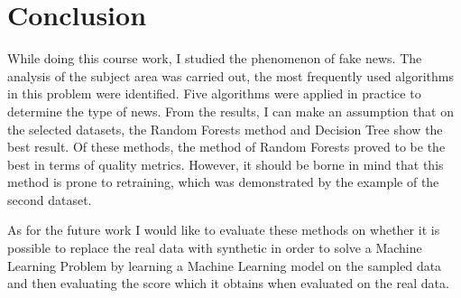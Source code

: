 \newpage
\section{Conclusion}\label{sec:concl}

While doing this course work, I studied the phenomenon of fake news.
The analysis of the subject area was carried out, the most frequently used algorithms in this problem were identified.
Five algorithms were applied in practice to determine the type of news.
From the results, I can make an assumption that on the selected datasets, the Random Forests method and Decision Tree show the best result.
Of these methods, the method of Random Forests proved to be the best in terms of quality metrics.
However, it should be borne in mind that this method is prone to retraining, which was demonstrated by the example of the second dataset.

As for the future work I would like to evaluate these methods on whether it is possible to replace the real data with synthetic in order to solve a Machine Learning Problem by learning a Machine Learning model on the sampled data and then evaluating the score which it obtains when evaluated on the real data.
